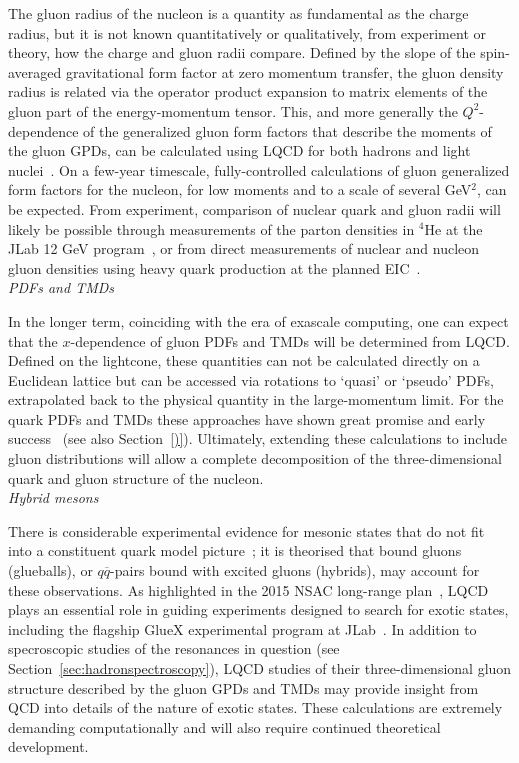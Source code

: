 The gluon radius of the nucleon is a quantity as fundamental as the charge radius, but it is not known quantitatively or qualitatively, from experiment or theory, how the charge and gluon radii compare. 
Defined by the slope of the spin-averaged gravitational form factor at zero momentum transfer, the gluon density radius is related via the operator product expansion to matrix elements of the gluon part of the energy-momentum tensor.
This, and more generally the $Q^2$-dependence of the generalized gluon form factors that describe the moments of the gluon GPDs, can be calculated using LQCD for both hadrons and light nuclei~\cite{Detmold:2017oqb,Winter:2017bfs}.
On a few-year timescale, fully-controlled calculations of gluon generalized form factors for the nucleon, for low moments and to a scale of several GeV$^2$, can be expected.
From experiment, comparison of nuclear quark and gluon radii will likely be possible through measurements of the parton densities in ${}^4$He at the JLab 12 GeV program~\cite{Hattawy:2017woc}, or from direct measurements of nuclear and nucleon gluon densities using heavy quark production at the planned EIC~\cite{Chudakov:2016otl}. \\


{\it PDFs and TMDs}

In the longer term, coinciding with the era of exascale computing, one can expect that the $x$-dependence of gluon PDFs and TMDs will be determined from LQCD. Defined on the lightcone, these quantities can not be calculated directly on a Euclidean lattice but can be accessed via rotations to `quasi' or `pseudo' PDFs, extrapolated back to the physical quantity in the large-momentum limit. For the quark PDFs and TMDs these approaches have shown great promise and early success~\cite{Lin:2014zya,Alexandrou:2015rja} ({see also \color{red} Section~\ref{)}}). Ultimately, extending these calculations to include gluon distributions will allow a complete decomposition of the three-dimensional quark and gluon structure of the nucleon.\\

{\it Hybrid mesons}

There is considerable experimental evidence for mesonic states that do not fit into a constituent quark model picture~\cite{Patrignani:2016xqp}; it is theorised that bound gluons (glueballs), or $q\overline{q}$-pairs bound with excited gluons (hybrids), may account for these observations. 
As highlighted in the 2015 NSAC long-range plan~\cite{Geesaman:2015fha}, LQCD plays an essential role in guiding experiments designed to search for exotic states, including the flagship GlueX experimental program at JLab~\cite{Dobbs:2017vjw}. 
In addition to specroscopic studies of the resonances in question (see Section~\ref{sec:hadronspectroscopy}), LQCD studies of their three-dimensional gluon structure described by the gluon GPDs and TMDs may provide insight from QCD into details of the nature of exotic states. These calculations are extremely demanding computationally and will also require continued theoretical development.
